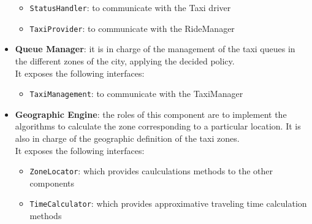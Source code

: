 \begin{itemize}
	\begin{itemize}
		\item \texttt{StatusHandler}: to communicate with the Taxi driver
		\item \texttt{TaxiProvider}: to communicate with the RideManager
	\end{itemize}
	\item \textbf{Queue Manager}\label{comp:QueueManager}: it is in charge of the management of the taxi queues in the different zones of the city, applying the decided policy.\\
	It exposes the following interfaces:
	\begin{itemize}
		\item \texttt{TaxiManagement}: to communicate with the TaxiManager
	\end{itemize}
	\item \textbf{Geographic Engine}\label{comp:GeographicEngine}: the roles of this component are to implement the algorithms to calculate the zone corresponding to a particular location. It is also in charge of the geographic definition of the taxi zones.\\It exposes the following interfaces:
	\begin{itemize}
		\item \texttt{ZoneLocator}: which provides caulculations methods to the other components
		\item \texttt{TimeCalculator}: which provides approximative traveling time calculation methods
	\end{itemize}
\end{itemize}